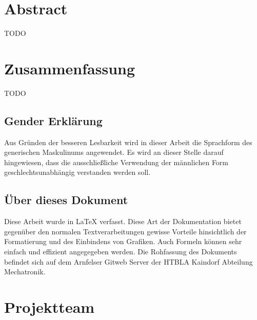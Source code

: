 \section*{Abstract}
\label{sec:abstract}
TODO

\section*{Zusammenfassung}
TODO

\clearpage

\newpage
\thispagestyle{empty}
\mbox{}

\clearpage

\subsection*{Gender Erklärung}
\label{sec:gender-erklaerung}
Aus Gründen der besseren Lesbarkeit wird in dieser Arbeit die Sprachform des generischen Maskulinums angewendet. Es wird an dieser Stelle darauf hingewiesen, dass die ausschließliche Verwendung der männlichen Form geschlechtsunabhängig verstanden werden soll.

\subsection*{Über dieses Dokument}
\label{sec:ueber-dokument}
Diese Arbeit wurde in \LaTeX{} verfasst. Diese Art der Dokumentation bietet gegenüber den normalen Textverarbeitungen gewisse Vorteile hinsichtlich der Formatierung und des Einbindens von Grafiken. Auch Formeln können sehr einfach und effizient angegegeben werden. Die Rohfassung des Dokuments befindet sich auf dem Arnfelser Gitweb Server der HTBLA Kaindorf Abteilung Mechatronik.

\clearpage

\newpage
\thispagestyle{empty}
\mbox{}

\clearpage

\section*{Projektteam}
\label{sec:projektteam}

